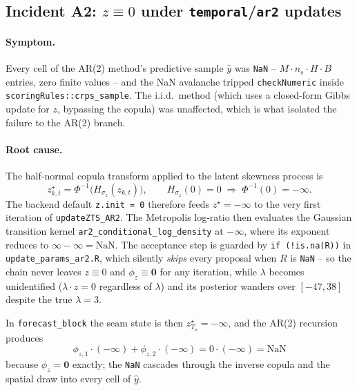 \documentclass[11pt]{article}
\theoremstyle{definition}
\theoremstyle{remark}
\begin{document}
\subsection{Incident A2: $z \equiv 0$ under \texttt{temporal}/\texttt{ar2} updates}
\label{sec:audit-zinit}

\paragraph{Symptom.}
Every cell of the AR(2) method's predictive sample $\hat y$ was
\texttt{NaN} -- $M \cdot n_s \cdot H \cdot B$ entries, zero
finite values -- and the NaN avalanche tripped
\texttt{checkNumeric} inside
\texttt{scoringRules::crps\_sample}. The i.i.d.\ method (which
uses a closed-form Gibbs update for $z$, bypassing the copula) was
unaffected, which is what isolated the failure to the AR(2) branch.

\paragraph{Root cause.}
The half-normal copula transform applied to the latent skewness
process is
\begin{equation*}
  z^\star_{k,t} = \Phi^{-1}\!\big(H_{\sigma_z}(z_{k,t})\big),
  \qquad
  H_{\sigma_z}(0) = 0
  \;\Longrightarrow\;
  \Phi^{-1}(0) = -\infty .
\end{equation*}
The backend default \texttt{z.init = 0} therefore feeds
$z^\star = -\infty$ to the very first iteration of
\texttt{updateZTS\_AR2}. The Metropolis log-ratio then evaluates the
Gaussian transition kernel
\texttt{ar2\_conditional\_log\_density} at $-\infty$, where its
exponent reduces to $\infty - \infty = \mathrm{NaN}$. The acceptance
step is guarded by \texttt{if (!is.na(R))} in
\texttt{update\_params\_ar2.R}, which silently \emph{skips} every
proposal when $R$ is \texttt{NaN} -- so the chain never leaves
$z \equiv 0$ and $\phi_z \equiv \bm 0$ for any iteration, while
$\lambda$ becomes unidentified ($\lambda \cdot z = 0$ regardless of
$\lambda$) and its posterior wanders over $[-47, 38]$ despite the
true $\lambda = 3$.

In \texttt{forecast\_block} the seam state is then
$z^\star_{T_o} = -\infty$, and the AR(2) recursion produces
\begin{equation*}
  \phi_{z,1}\cdot(-\infty) + \phi_{z,2}\cdot(-\infty)
  = 0\cdot(-\infty) = \mathrm{NaN}
\end{equation*}
because $\phi_z = \bm 0$ exactly; the \texttt{NaN} cascades through
the inverse copula and the spatial draw into every cell of
$\hat y$.
\end{document}
